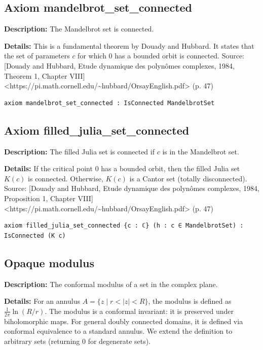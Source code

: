 \subsection*{Axiom mandelbrot\_set\_connected}
\textbf{Description:} The Mandelbrot set is connected.

\textbf{Details:} This is a fundamental theorem by Douady and Hubbard. It states that the set of parameters $c$ for which $0$ has a bounded orbit is connected.
Source: [Douady and Hubbard, Etude dynamique des polynômes complexes, 1984, Theorem 1, Chapter VIII] <https://pi.math.cornell.edu/\textasciitilde{}hubbard/OrsayEnglish.pdf> (p. 47)

\begin{lstlisting}[language=Lean]
axiom mandelbrot_set_connected : IsConnected MandelbrotSet
\end{lstlisting}

\subsection*{Axiom filled\_julia\_set\_connected}
\textbf{Description:} The filled Julia set is connected if $c$ is in the Mandelbrot set.

\textbf{Details:} If the critical point $0$ has a bounded orbit, then the filled Julia set $K(c)$ is connected.
Otherwise, $K(c)$ is a Cantor set (totally disconnected).
Source: [Douady and Hubbard, Etude dynamique des polynômes complexes, 1984, Proposition 1, Chapter VIII] <https://pi.math.cornell.edu/\textasciitilde{}hubbard/OrsayEnglish.pdf> (p. 47)

\begin{lstlisting}[language=Lean]
axiom filled_julia_set_connected {c : ℂ} (h : c ∈ MandelbrotSet) : IsConnected (K c)
\end{lstlisting}

\subsection*{Opaque modulus}
\textbf{Description:} The conformal modulus of a set in the complex plane.

\textbf{Details:} For an annulus $A = \{z \mid r < |z| < R\}$, the modulus is defined as $\frac{1}{2\pi} \ln(R/r)$.
The modulus is a conformal invariant: it is preserved under biholomorphic maps.
For general doubly connected domains, it is defined via conformal equivalence to a standard annulus.
We extend the definition to arbitrary sets (returning 0 for degenerate sets).

